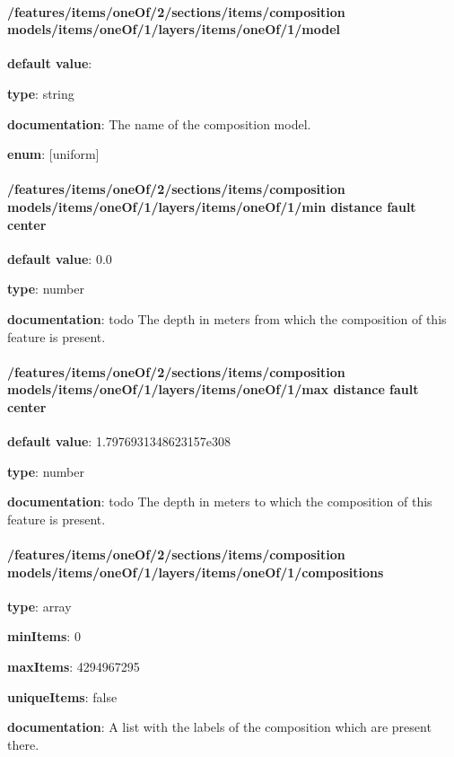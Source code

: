 \paragraph{/features/items/oneOf/2/sections/items/composition models/items/oneOf/1/layers/items/oneOf/1/model} \begin{itemized}
\item {\bf default value}: 
\item {\bf type}: string
\item {\bf documentation}: The name of the composition model.
\item {\bf enum}: [uniform]\end{itemized}\paragraph{/features/items/oneOf/2/sections/items/composition models/items/oneOf/1/layers/items/oneOf/1/min distance fault center} \begin{itemized}
\item {\bf default value}: 0.0
\item {\bf type}: number
\item {\bf documentation}: todo The depth in meters from which the composition of this feature is present.
\end{itemized}\paragraph{/features/items/oneOf/2/sections/items/composition models/items/oneOf/1/layers/items/oneOf/1/max distance fault center} \begin{itemized}
\item {\bf default value}: 1.7976931348623157e308
\item {\bf type}: number
\item {\bf documentation}: todo The depth in meters to which the composition of this feature is present.
\end{itemized}\paragraph{/features/items/oneOf/2/sections/items/composition models/items/oneOf/1/layers/items/oneOf/1/compositions} \begin{itemized}
\item {\bf type}: array
\item {\bf minItems}: 0
\item {\bf maxItems}: 4294967295
\item {\bf uniqueItems}: false
\item {\bf documentation}: A list with the labels of the composition which are present there.

\end{itemized}

